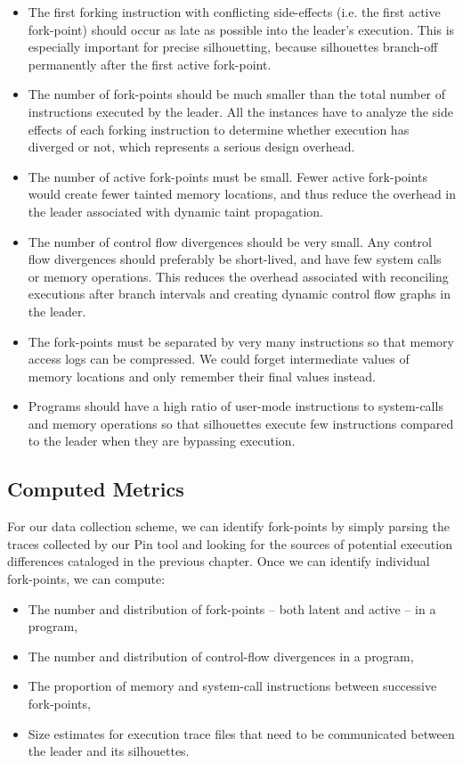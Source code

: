 \begin{itemize}
\item The first forking instruction
with conflicting side-effects (i.e. the first 
active fork-point) should occur as late as possible 
into the leader's execution.
This is especially important for precise silhouetting,
because silhouettes branch-off
permanently after the first
active fork-point.

\item The number of fork-points should
be much smaller than the total number of instructions executed
by the leader.
All the instances
have to analyze the side effects
of each forking instruction
to determine whether execution has 
diverged or not, which represents 
a serious design overhead.

\item The number of active fork-points
must be small. Fewer 
active fork-points would 
create fewer tainted memory locations,
and thus reduce the overhead
in the leader associated with dynamic
taint propagation.

\item The number of control flow divergences
should be very small. Any control flow divergences
should preferably be short-lived, and have
few system calls or memory operations.
This reduces the overhead
associated with reconciling
executions after branch intervals
and creating dynamic control
flow graphs in the leader.

\item The fork-points must be separated 
by very many instructions so that
memory access logs can be compressed. 
We could forget intermediate
values of memory locations and only
remember their final values instead.

\item Programs should have a high
ratio of user-mode instructions to system-calls
and memory operations so that
silhouettes execute few
instructions compared to
the leader when they are bypassing execution. 

\end{itemize}

\subsection{Computed Metrics}
For our data collection scheme, we can identify fork-points by 
simply parsing the traces collected by our Pin tool
and looking for the sources of potential execution
differences cataloged in the previous chapter. 
Once we can identify individual fork-points, we can compute:
\begin{itemize}
\item The number and distribution of fork-points -- both latent and active -- in a program,
\item The number and distribution of control-flow divergences in a program,
\item The proportion of memory and system-call instructions between successive fork-points,
\item Size estimates for execution trace files that need to be communicated between
  the leader and its silhouettes.
\end{itemize}


